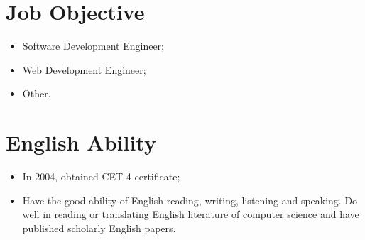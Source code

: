 \documentclass[a4paper,10pt,english]{manual}
\begin{document}
\section{Job Objective}
\begin{itemize}
\item {} 
Software Development Engineer;

\item {} 
Web Development Engineer;

\item {} 
Other.

\end{itemize}


\section{English Ability}
\begin{itemize}
\item {} 
In 2004, obtained CET-4 certificate;

\item {} 
Have the good ability of English reading, writing, listening and speaking. Do well in reading or translating English literature of computer science and have published scholarly English papers.

\end{itemize}
\end{document}
